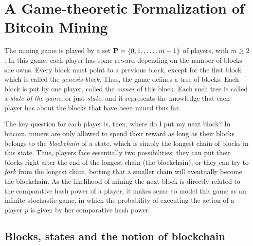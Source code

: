 
\section{A Game-theoretic Formalization of Bitcoin Mining}
\label{sec-formalization}

The mining game is played by a set $\mathbf{P} = \{0, 1, , \ldots, m-1\}$ of players, with $m \geq 2$.
In this game, each player has some reward depending on the number of blocks she owns. Every block must point to a previous block, except for the first block which is called the {\em genesis block}. Thus, the game defines a tree of blocks. Each block is put by one player, called the {\em owner} of this block. Each such tree is called a {\em state of the game}, or just {\em state}, and it represents the knowledge that each player has about the blocks that have been mined thus far.

The key question for each player is, then, where do I put my next block? In bitcoin, miners are only allowed to spend their reward as long
as their blocks belongs to the \emph{blockchain} of a state, which is simply the longest chain of blocks in this state. Thus, players face essentially two possibilities: they can put their blocks right after the end of the longest chain (the blockchain), or they can try to \emph{fork}
from the longest chain, betting that a smaller chain will eventually become the blockchain. As the likelihood of
mining the next block is directly related to the comparative hash power of a player, it makes sense to model this game as an infinite
stochastic game, in which the probability of executing the action of a player $p$ is given by her comparative hash power.



\subsection{Blocks, states and the notion of blockchain}\label{sub:states}

